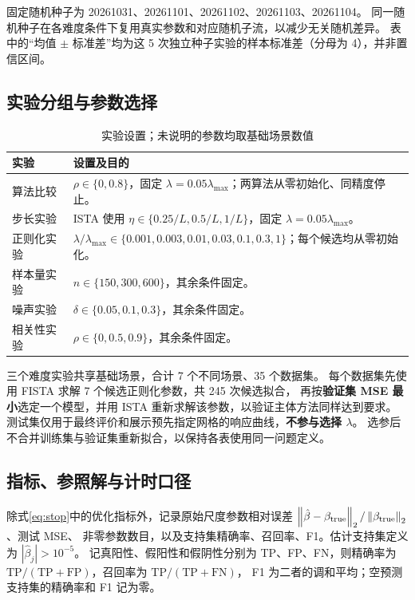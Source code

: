 \documentclass[UTF8,11pt,a4paper,fontset=fandol]{ctexart}
\newcommand{\norm}[1]{\left\|#1\right\|}
\begin{document}
固定随机种子为 20261031、20261101、20261102、20261103、20261104。
同一随机种子在各难度条件下复用真实参数和对应随机子流，以减少无关随机差异。
表中的“均值 $\pm$ 标准差”均为这 5 次独立种子实验的样本标准差（分母为 4），并非置信区间。

\subsection{实验分组与参数选择}
\begin{table}[htbp]
\centering\small
\caption{实验设置；未说明的参数均取基础场景数值}
\begin{tabular}{p{2.5cm}p{10.4cm}}
\toprule
实验 & 设置及目的\\
\midrule
算法比较 & $\rho\in\{0,0.8\}$，固定 $\lambda=0.05\lambda_{\max}$；两算法从零初始化、同精度停止。\\
步长实验 & ISTA 使用 $\eta\in\{0.25/L,0.5/L,1/L\}$，固定 $\lambda=0.05\lambda_{\max}$。\\
正则化实验 & $\lambda/\lambda_{\max}\in\{0.001,0.003,0.01,0.03,0.1,0.3,1\}$；每个候选均从零初始化。\\
样本量实验 & $n\in\{150,300,600\}$，其余条件固定。\\
噪声实验 & $\delta\in\{0.05,0.1,0.3\}$，其余条件固定。\\
相关性实验 & $\rho\in\{0,0.5,0.9\}$，其余条件固定。\\
\bottomrule
\end{tabular}
\end{table}

三个难度实验共享基础场景，合计 7 个不同场景、35 个数据集。
每个数据集先使用 FISTA 求解 7 个候选正则化参数，共 245 次候选拟合，
再按\textbf{验证集 MSE 最小}选定一个模型，并用 ISTA 重新求解该参数，以验证主体方法同样达到要求。
测试集仅用于最终评价和展示预先指定网格的响应曲线，\textbf{不参与选择 $\lambda$}。
选参后不合并训练集与验证集重新拟合，以保持各表使用同一问题定义。

\subsection{指标、参照解与计时口径}
除式\eqref{eq:stop}中的优化指标外，记录原始尺度参数相对误差
$\norm{\hat\beta-\beta_{\rm true}}_2/\norm{\beta_{\rm true}}_2$、测试 MSE、
非零参数数目，以及支持集精确率、召回率、F1。估计支持集定义为 $|\hat\beta_j|>10^{-5}$。
记真阳性、假阳性和假阴性分别为 TP、FP、FN，则精确率为
$\mathrm{TP}/(\mathrm{TP}+\mathrm{FP})$，召回率为 $\mathrm{TP}/(\mathrm{TP}+\mathrm{FN})$，
F1 为二者的调和平均；空预测支持集的精确率和 F1 记为零。
\end{document}
